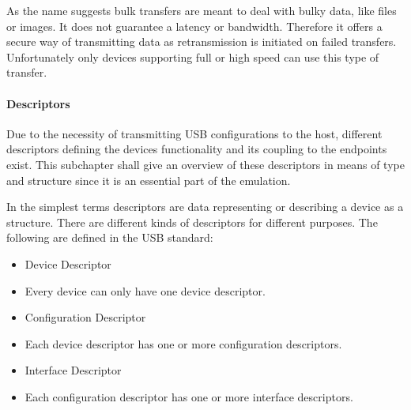 {As the name suggests bulk transfers are meant to deal with bulky data,
like files or images. It does not guarantee a latency or bandwidth.
Therefore it offers a secure way of transmitting data as retransmission
is initiated on failed transfers. Unfortunately only devices supporting
full or high speed can use this type of transfer. }

\hypertarget{h.c8rxmh3196o7}{\paragraph{\texorpdfstring{{Descriptors}}{Descriptors}}\label{h.c8rxmh3196o7}}

{Due to the necessity of transmitting USB configurations to the host,
different descriptors defining the devices functionality and its
coupling to the endpoints exist. This subchapter shall give an overview
of these descriptors in means of type and structure since it is an
essential part of the emulation. }

{In the simplest terms descriptors are data representing or describing a
device as a structure. There are different kinds of descriptors for
different purposes. The following are defined in the USB standard:}

\begin{itemize}
\tightlist
\item
  {Device Descriptor}
\end{itemize}

\begin{itemize}
\tightlist
\item
  {Every device can only have one device descriptor.}
\end{itemize}

\begin{itemize}
\tightlist
\item
  {Configuration Descriptor}
\end{itemize}

\begin{itemize}
\tightlist
\item
  {Each device descriptor has one or more configuration descriptors.}
\end{itemize}

\begin{itemize}
\tightlist
\item
  {Interface Descriptor}
\end{itemize}

\begin{itemize}
\tightlist
\item
  {Each configuration descriptor has one or more interface descriptors.}
\end{itemize}

